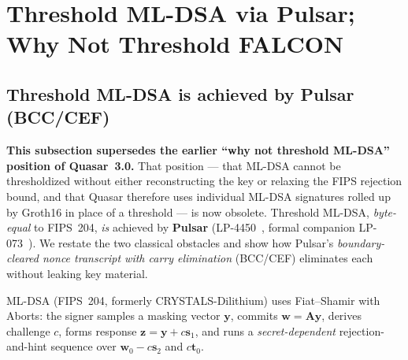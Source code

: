 \section{Threshold ML-DSA via Pulsar; Why Not Threshold FALCON}

\label{sec:why-not-threshold}
\label{app:no-threshold-mldsa}

\subsection{Threshold ML-DSA is achieved by Pulsar (BCC/CEF)}
\label{sec:threshold-mldsa-pulsar}

\textbf{This subsection supersedes the earlier ``why not threshold
ML-DSA'' position of Quasar~3.0.} That position --- that ML-DSA cannot
be thresholdized without either reconstructing the key or relaxing the
FIPS rejection bound, and that Quasar therefore uses individual ML-DSA
signatures rolled up by Groth16 in place of a threshold --- is now
obsolete. Threshold ML-DSA, \emph{byte-equal} to FIPS~204, \emph{is}
achieved by \textbf{Pulsar} (LP-4450~\cite{lp4450}, formal companion
LP-073~\cite{lp073}). We restate the two classical obstacles and show
how Pulsar's \emph{boundary-cleared nonce transcript with carry
elimination} (BCC/CEF) eliminates each without leaking key material.

ML-DSA (FIPS~204, formerly CRYSTALS-Dilithium) uses Fiat--Shamir with
Aborts: the signer samples a masking vector $\mathbf{y}$, commits
$\mathbf{w} = \mathbf{A}\mathbf{y}$, derives challenge $c$, forms
response $\mathbf{z} = \mathbf{y} + c\mathbf{s}_1$, and runs a
\emph{secret-dependent} rejection-and-hint sequence over
$\mathbf{w}_0 - c\mathbf{s}_2$ and $c\mathbf{t}_0$.

